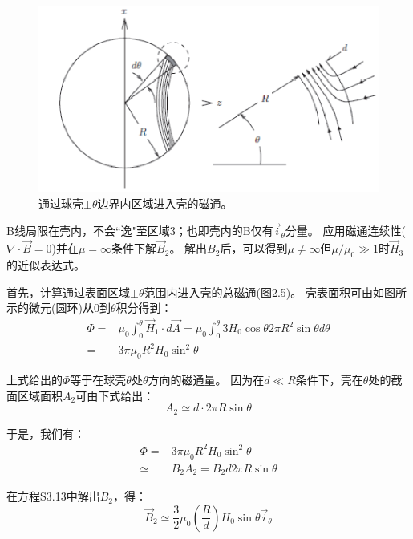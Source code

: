 \begin{figure}[htbp]
	\centering
	\includegraphics[scale=0.8]{chpt2/figs/fig2.5.eps}
	\caption{通过球壳$\pm \theta$边界内区域进入壳的磁通。}
\end{figure}

B线局限在壳内，不会``逸"至区域3；也即壳内的B仅有$\vec{i}_\theta$分量。
应用磁通连续性($\nabla \cdot \vec{B}=0$)并在$\mu=\infty$条件下解$\vec{B}_2$。
解出$B_2$后，可以得到$\mu \neq \infty$但$\mu/\mu_0 \gg 1$时$\vec{H}_3$的近似表达式。

首先，计算通过表面区域$\pm \theta$范围内进入壳的总磁通(图2.5)。
壳表面积可由如图所示的微元(圆环)从$0$到$\theta$积分得到：
\begin{align}
\Phi=&\mu_0\int_{0}^{\theta} \vec{H}_1 \cdot d\vec{A}=\mu_0\int_{0}^{\theta} 3H_0\cos\theta 2\pi R^2 \sin\theta d\theta\nonumber\\
=&3\pi\mu_0 R^2 H_0 \sin^2 \theta\nonumber \tag{S3.11}
\end{align}

上式给出的$\Phi$等于在球壳$\theta$处$\theta$方向的磁通量。
因为在$d\ll R$条件下，壳在$\theta$处的截面区域面积$A_2$可由下式给出：
\begin{equation*}
A_2\simeq d\cdot 2\pi R\sin\theta \tag{S3.12}
\end{equation*}

于是，我们有：
\begin{align}
\Phi=&3\pi\mu_0 R^2 H_0 \sin^2 \theta\nonumber\\
\simeq& B_2 A_2=B_2 d 2 \pi R \sin\theta \tag{S3.13}
\end{align}

在方程S3.13中解出$B_2$，得：
\begin{equation*}
\vec{B}_2\simeq \frac{3}{2}\mu_0 \left(\frac{R}{d}\right) H_0\sin\theta\vec{i}_\theta \tag{S3.14}
\end{equation*}

